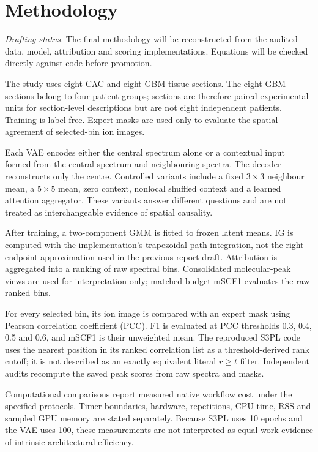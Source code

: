 \section{Methodology}
\label{sec:methodology}

\emph{Drafting status.} The final methodology will be reconstructed from the
audited data, model, attribution and scoring implementations. Equations will be
checked directly against code before promotion.

The study uses eight CAC and eight GBM tissue sections. The eight GBM sections
belong to four patient groups; sections are therefore paired experimental units
for section-level descriptions but are not eight independent patients. Training
is label-free. Expert masks are used only to evaluate the spatial agreement of
selected-bin ion images.

Each VAE encodes either the central spectrum alone or a contextual input formed
from the central spectrum and neighbouring spectra. The decoder reconstructs
only the centre. Controlled variants include a fixed $3\times3$ neighbour mean,
a $5\times5$ mean, zero context, nonlocal shuffled context and a learned
attention aggregator. These variants answer different questions and are not
treated as interchangeable evidence of spatial causality.

After training, a two-component GMM is fitted to frozen latent means. IG is
computed with the implementation's trapezoidal path integration, not the
right-endpoint approximation used in the previous report draft. Attribution is
aggregated into a ranking of raw spectral bins. Consolidated molecular-peak
views are used for interpretation only; matched-budget mSCF1 evaluates the raw
ranked bins.

For every selected bin, its ion image is compared with an expert mask using
Pearson correlation coefficient (PCC). F1 is evaluated at PCC thresholds 0.3,
0.4, 0.5 and 0.6, and mSCF1 is their unweighted mean. The reproduced S3PL code
uses the nearest position in its ranked correlation list as a threshold-derived
rank cutoff; it is not described as an exactly equivalent literal
$r\geq t$ filter. Independent audits recompute the saved peak scores from raw
spectra and masks.

Computational comparisons report measured native workflow cost under the
specified protocols. Timer boundaries, hardware, repetitions, CPU time, RSS and
sampled GPU memory are stated separately. Because S3PL uses 10 epochs and the
VAE uses 100, these measurements are not interpreted as equal-work evidence of
intrinsic architectural efficiency.

